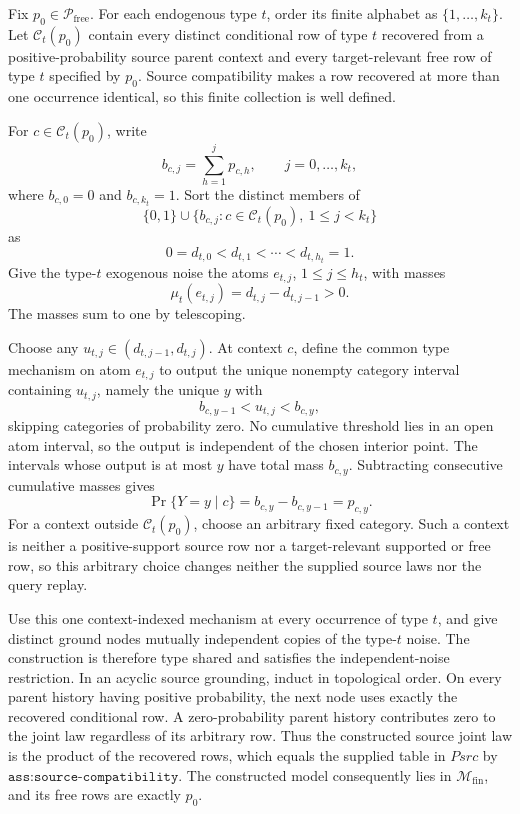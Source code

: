 Fix \(p_0\in\mathcal P_{\mathrm{free}}\).  For each endogenous type \(t\), order its finite alphabet as \(\{1,\ldots,k_t\}\).  Let \(\mathcal C_t(p_0)\) contain every distinct conditional row of type \(t\) recovered from a positive-probability source parent context and every target-relevant free row of type \(t\) specified by \(p_0\).  Source compatibility makes a row recovered at more than one occurrence identical, so this finite collection is well defined.

For \(c\in\mathcal C_t(p_0)\), write
\[
 b_{c,j}=\sum_{h=1}^{j}p_{c,h},
 \qquad j=0,\ldots,k_t,
\]
where \(b_{c,0}=0\) and \(b_{c,k_t}=1\).  Sort the distinct members of
\[
 \{0,1\}\cup
 \{b_{c,j}:c\in\mathcal C_t(p_0),\ 1\leq j<k_t\}
\]
as
\[
 0=d_{t,0}<d_{t,1}<\cdots<d_{t,h_t}=1.
\]
Give the type-\(t\) exogenous noise the atoms \(e_{t,j}\), \(1\leq j\leq h_t\), with masses
\[
 \mu_t(e_{t,j})=d_{t,j}-d_{t,j-1}>0.
\]
The masses sum to one by telescoping.

Choose any \(u_{t,j}\in(d_{t,j-1},d_{t,j})\).  At context \(c\), define the common type mechanism on atom \(e_{t,j}\) to output the unique nonempty category interval containing \(u_{t,j}\), namely the unique \(y\) with
\[
 b_{c,y-1}<u_{t,j}<b_{c,y},
\]
skipping categories of probability zero.  No cumulative threshold lies in an open atom interval, so the output is independent of the chosen interior point.  The intervals whose output is at most \(y\) have total mass \(b_{c,y}\).  Subtracting consecutive cumulative masses gives
\[
 \Pr\{Y=y\mid c\}=b_{c,y}-b_{c,y-1}=p_{c,y}.
\]
For a context outside \(\mathcal C_t(p_0)\), choose an arbitrary fixed category.  Such a context is neither a positive-support source row nor a target-relevant supported or free row, so this arbitrary choice changes neither the supplied source laws nor the query replay.

Use this one context-indexed mechanism at every occurrence of type \(t\), and give distinct ground nodes mutually independent copies of the type-\(t\) noise.  The construction is therefore type shared and satisfies the independent-noise restriction.  In an acyclic source grounding, induct in topological order.  On every parent history having positive probability, the next node uses exactly the recovered conditional row.  A zero-probability parent history contributes zero to the joint law regardless of its arbitrary row.  Thus the constructed source joint law is the product of the recovered rows, which equals the supplied table in \(Psrc\) by \(\texttt{ass:source-compatibility}\).  The constructed model consequently lies in \(\mathcal M_{\mathrm{fin}}\), and its free rows are exactly \(p_0\).


